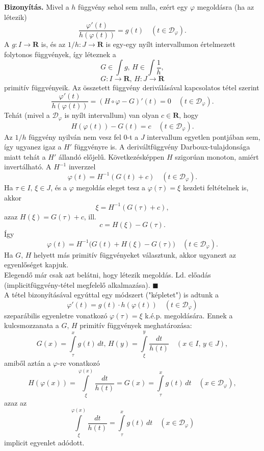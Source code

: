 \documentclass{article}
\newcommand{\R}{\mathbf{R}}
\newcommand{\Dp}{\mathcal{D}_\varphi}
\begin{document}
	\textbf{Bizonyítás.} Mivel a $h$ függvény sehol sem nulla, ezért egy $\varphi$ megoldásra (ha az létezik)
	\[
		\frac{\varphi'(t)}{h(\varphi(t))} = g(t) \quad (t \in \Dp).
	\]
	A $g : I \to \R$ is, és az $1 / h : J \to \R$ is egy-egy nyílt intervallumon értelmezett folytonos függvények, így léteznek a
	\[
		G \in \int g, \, H \in \int \frac{1}{h},
	\]
	\[
		G : I \to \R, \, H : J \to \R
	\]
	primitív függvényeik. Az összetett függvény deriválásával kapcsolatos tétel szerint
	\[
		\frac{\varphi'(t)}{h(\varphi(t))} = (H \circ \varphi - G)'(t) = 0 \quad (t \in \Dp).
	\]
	Tehát (mivel a $\Dp$ is nyílt intervallum) van olyan $c \in \R$, hogy
	\[
		H(\varphi(t)) - G(t) = c \quad (t \in \Dp).
	\]
	Az $1/h$ függvény nyilván nem vesz fel 0-t a $J$ intervallum egyetlen pontjában sem, így ugyanez igaz a $H'$ függvényre is. A deriváltfüggvény Darboux-tulajdonsága miatt tehát a $H'$ állandó előjelű. Következésképpen $H$ szigorúan monoton, amiért invertálható. A $H^{-1}$ inverzzel
	\[
		\varphi(t) = H^{-1}(G(t) + c) \quad (t \in \Dp).
	\]
	Ha $\tau \in I, \, \xi \in J$, és a $\varphi$ megoldás eleget tesz a $\varphi(\tau) = \xi$ kezdeti feltételnek is, akkor
	\[
		\xi = H^{-1}(G(\tau) + c),
	\]
	azaz $H(\xi) = G(\tau) + c$, ill.
	\[
		c = H(\xi) - G(\tau).
	\]
	Így
	\[
		\varphi(t) = H^{-1}\big( G(t) + H(\xi) - G(\tau) \big) \quad (t \in \Dp).
	\]
	Ha $G, \, H$ helyett más primitív függvényeket választunk, akkor ugyanezt az egyenlőséget kapjuk.\\
	
	Elegendő már csak azt belátni, hogy létezik megoldás. Ld. előadás (implicitfüggvény-tétel megfelelő alkalmazása). $\blacksquare$\\
	
	A tétel bizonyításával egyúttal egy módszert ("képletet") is adtunk a
	\[
		\varphi'(t) = g(t) \cdot h(\varphi(t)) \quad (t \in \Dp)
	\]
	szeparábilis egyenletre vonatkozó $\varphi(\tau) = \xi$ k.é.p. megoldására. Ennek a kulcsmozzanata a $G, \, H$ primitív függvények meghatározása:
	\[
		G(x) = \int\limits_\tau^x g(t) \, dt, \, H(y) = \int\limits_\xi^y \frac{dt}{h(t)} \quad (x \in I, \, y \in J),
	\]
	amiből aztán a $\varphi$-re vonatkozó
	\[
		H(\varphi(x)) = \int\limits_\xi^{\varphi(x)} \frac{dt}{h(t)} = G(x) = \int\limits_\tau^x g(t) \, dt \quad (x \in \Dp),
	\]
	azaz az
	\[
		\int\limits_\xi^{\varphi(x)} \frac{dt}{h(t)} = \int\limits_\tau^x g(t) \, dt \quad (x \in \Dp)
	\]
	implicit egyenlet adódott.
	
	
	
	
\end{document}
